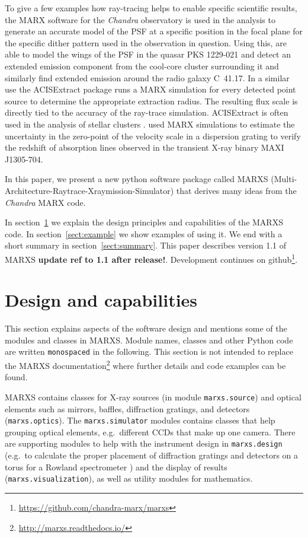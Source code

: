 \documentclass[twocolumn]{aastex61}
\begin{document}
To give a few examples how ray-tracing helps to enable specific scientific
results, the MARX software \citep{2012SPIE.8443E..1AD,2013ascl.soft02001W} for
the \emph{Chandra} observatory is used in the analysis to generate an accurate
model of the PSF at a specific position in the focal plane for the specific
dither pattern used in the observation in question. Using this,
\citet{2012MNRAS.422..590R} are able to model the wings of the PSF in the
quasar PKS 1229-021 and detect an extended emission component from the
cool-core cluster surrounding it and similarly \citet{2017MNRAS.468..109W} find
extended emission around the radio galaxy C~41.17. In a similar use the
ACISExtract package \citep{2010ApJ...714.1582B,2012ascl.soft03001B} runs a MARX
simulation for every detected point source to determine the appropriate
extraction radius. The resulting flux scale is directly tied to the accuracy of
the ray-trace simulation. ACISExtract is often used in the analysis of stellar
clusters \citep[e.g.][]{2013ApJS..209...27K}. \citet{2014ApJ...788...53M} used
MARX simulations to estimate the uncertainty in the zero-point of the velocity
scale in a dispersion grating to verify the redshift of absorption lines
observed in the transient X-ray binary MAXI J1305-704.

In this paper, we present a new python software package called MARXS
(Multi-Architecture-Raytrace-Xraymission-Simulator) that derives many ideas from
the \emph{Chandra} MARX code.

In section~\ref{sect:design} we explain the design principles and capabilities
of the MARXS code. In section~\ref{sect:example} we show examples of using
it.
We end with a short summary in section~\ref{sect:summary}. This paper describes
version 1.1 of MARXS \citep{marxs1.0} \textbf{update ref to 1.1 after release!}.
Development continues on github\footnote{\url{https://github.com/chandra-marx/marxs}}.

\section{Design and capabilities}
\label{sect:design}
This section explains aspects of the software design and mentions some of
the modules and classes in MARXS. Module names, classes and other Python code
are written \texttt{monospaced} in the following. This section is not intended
to replace the MARXS documentation\footnote{\url{http://marxs.readthedocs.io/}}
where further details and code examples can be found.

MARXS contains classes for X-ray sources (in module \texttt{marxs.source}) and
optical elements such as mirrors, baffles, diffraction gratings, and detectors
(\texttt{marxs.optics}). The \texttt{marxs.simulator} modules contains classes
that help grouping optical elements, e.g.\ different CCDs that make up one
camera. There are supporting modules to help with the instrument design in
\texttt{marxs.design} (e.g.\ to calculate the proper placement of diffraction
gratings and detectors on a torus for a Rowland spectrometer \citep[see
  e.g.][]{Beuermann:78}) and the display of results
(\texttt{marxs.visualization}), as well as utility modules for mathematics.
\end{document}
